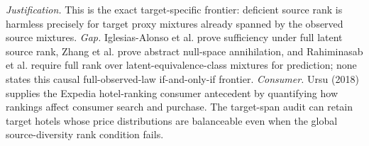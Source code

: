 \documentclass{article}
\begin{document}
\par\smallskip\noindent \textit{Justification.} This is the exact target-specific frontier: deficient source rank is harmless precisely for target proxy mixtures already spanned by the observed source mixtures. \textit{Gap.} Iglesias-Alonso et al. prove sufficiency under full latent source rank, Zhang et al. prove abstract null-space annihilation, and Rahiminasab et al. require full rank over latent-equivalence-class mixtures for prediction; none states this causal full-observed-law if-and-only-if frontier. \textit{Consumer.} Ursu (2018) supplies the Expedia hotel-ranking consumer antecedent by quantifying how rankings affect consumer search and purchase. The target-span audit can retain target hotels whose price distributions are balanceable even when the global source-diversity rank condition fails.
\end{document}
